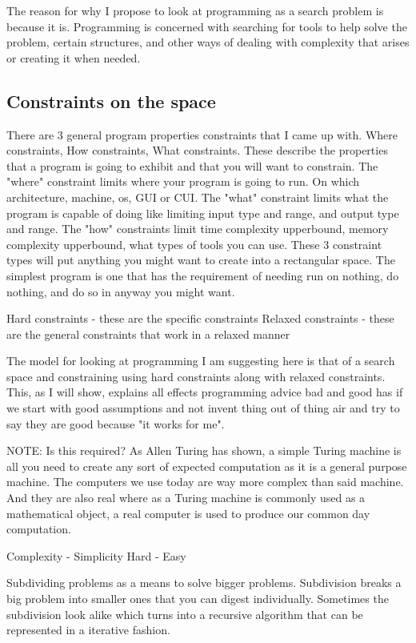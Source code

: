 \documentclass[a4paper]{article}
\begin{document}
The reason for why I propose to look at programming as a search problem is because it is. 
Programming is concerned with searching for tools to help solve the problem, certain 
structures, and other ways of dealing with complexity that arises or creating it when needed. 

\subsection{Constraints on the space}
There are 3 general program properties constraints that I came up with. Where constraints, 
How constraints, What constraints. These describe the properties that a program is going 
to exhibit and that you will want to constrain. The "where" constraint limits where your 
program is going to run. On which architecture, machine, os, GUI or CUI. The "what" constraint
limits what the program is capable of doing like limiting input type and range, and output
type and range. The "how" constraints limit time complexity upperbound, memory complexity 
upperbound, what types of tools you can use. These 3 constraint types will put anything you 
might want to create into a rectangular space. The simplest program is one that has the 
requirement of needing run on nothing, do nothing, and do so in anyway you might want.


Hard constraints - these are the specific constraints
Relaxed constraints - these are the general constraints that work in a relaxed manner

The model for looking at programming I am suggesting here is that of a search space and constraining using hard constraints along with relaxed constraints. This, as I will show, explains all effects programming advice bad and good has if we start with good assumptions and not invent thing out of thing air and try to say they are good because "it works for me". 

NOTE: Is this required? 
As Allen Turing has shown, a simple Turing machine is all you need to create any sort of expected computation as it is a general purpose machine. The computers we use today are way more complex than said machine. And they are also real where as a Turing machine is commonly used as a mathematical object, a real computer is used to produce our common day computation.


Complexity - Simplicity 
Hard - Easy 

Subdividing problems as a means to solve bigger problems. Subdivision breaks a big problem into smaller ones that you can digest individually. Sometimes the subdivision look alike which turns into a recursive algorithm that can be represented in a iterative fashion. 
\end{document}

